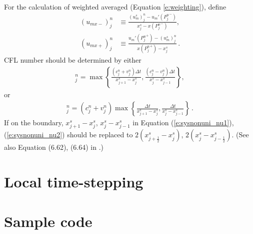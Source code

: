 \documentclass[11pt,dvips]{article}
\numberwithin{equation}{section}
\begin{document}
For the calculation of weighted averaged (Equation \ref{e:weighting}), define
\begin{align}
  (u_{mx-})_j^n &\equiv
    \frac{(u_m^s)_j^n-u_m'({P_j^n}^-)}{x_j^s-x({P_j^n}^-)}, \\
  (u_{mx+})_j^n &\equiv
    \frac{u_m'({P_j^n}^+)-(u_m^s)_j^n}{x({P_j^n}^+)-x_j^s}\,.
\end{align}
\citep[See also Equation (6.44), (6.45) in][]{chang_not_2008}  CFL number
should be determined by either
\begin{align}
  [\nu^{(1)}]_j^n =
    \max\left\{
      \frac{(c_j^n+v_j^n)\Delta t}{x_{j+1}^s-x_j^s},
      \frac{(c_j^n-v_j^n)\Delta t}{x_j^s-x_{j-1}^s}
    \right\}, \label{e:sysnonuni_nu1}
\end{align}
or
\begin{align}
  [\nu^{(2)}]_j^n =
    (c_j^n+v_j^n)\max\left\{
      \frac{\Delta t}{x_{j+1}^s-x_j^s},
      \frac{\Delta t}{x_j^s-x_{j-1}^s}
    \right\}\,. \label{e:sysnonuni_nu2}
\end{align}
If on the boundary, $x_{j+1}^s-x_j^s$, $x_j^s-x_{j-1}^s$ in Equation
(\ref{e:sysnonuni_nu1}), (\ref{e:sysnonuni_nu2}) should be replaced to
$2(x_{j+\frac{1}{2}}^s-x_j^s)$, $2(x_j^s-x_{j-\frac{1}{2}}^s)$.  (See also
Equation (6.62), (6.64) in \citep{chang_not_2008}.)

\section{Local time-stepping}
\label{s:lts}

\section{Sample code}
\label{s:code}

\clearpage


\end{document}
